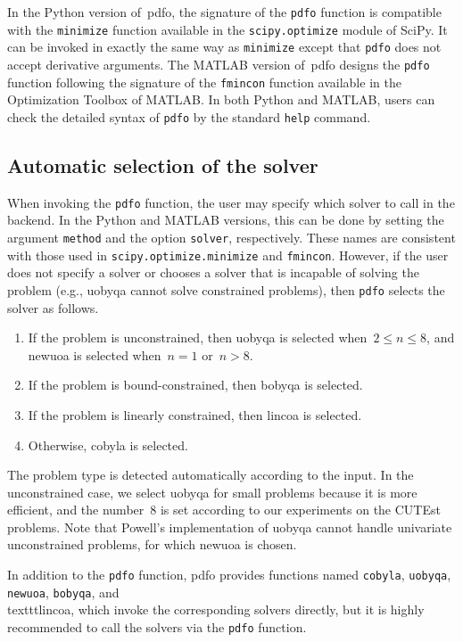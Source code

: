 \documentclass{article}
\numberwithin{equation}{section}
\theoremstyle{definition}
\theoremstyle{plain}
\theoremstyle{remark}
\begin{document}
In the Python version of~\gls{pdfo}, the signature of the \texttt{pdfo} function is compatible with the \texttt{minimize} function available in the \texttt{scipy.optimize} module of SciPy.
It can be invoked in exactly the same way as \texttt{minimize} except that \texttt{pdfo} does not accept derivative arguments.
The MATLAB version of~\gls{pdfo} designs the \texttt{pdfo} function following the signature of the \texttt{fmincon} function available in the Optimization Toolbox of MATLAB.
In both Python and MATLAB, users can check the detailed syntax of \texttt{pdfo} by the standard \texttt{help} command.

\subsection{Automatic selection of the solver}
\label{subsec:solver-selection}

When invoking the \texttt{pdfo} function, the user may specify which solver to call in the backend.
In the Python and MATLAB versions, this can be done by setting the argument \texttt{method} and the option \texttt{solver}, respectively.
These names are consistent with those used in \texttt{scipy.optimize.minimize} and \texttt{fmincon}.
However, if the user does not specify a solver or chooses a solver that is incapable of solving the problem (e.g., \gls{uobyqa} cannot solve constrained problems), then \texttt{pdfo} selects the solver as follows.
\begin{enumerate}
    \item If the problem is unconstrained, then \gls{uobyqa} is selected when~$2 \le n \le 8$, and \gls{newuoa} is selected when~$n = 1$ or~$n > 8$.
    \item If the problem is bound-constrained, then \gls{bobyqa} is selected.
    \item If the problem is linearly constrained, then \gls{lincoa} is selected.
    \item Otherwise, \gls{cobyla} is selected.
\end{enumerate}
The problem type is detected automatically according to the input.
In the unconstrained case, we select \gls{uobyqa} for small problems because it is more efficient, and the number~\num{8} is set according to our experiments on the CUTEst~\cite{Gould_Orban_Toint_2015} problems.
Note that Powell's implementation of \gls{uobyqa} cannot handle univariate unconstrained problems, for which \gls{newuoa} is chosen.

In addition to the \texttt{pdfo} function, \gls{pdfo} provides functions named \texttt{cobyla}, \texttt{uobyqa}, \texttt{newuoa}, \texttt{bobyqa}, and~\\texttt{lincoa}, which invoke the corresponding solvers directly, but it is highly recommended to call the solvers via the \texttt{pdfo} function.
\end{document}
